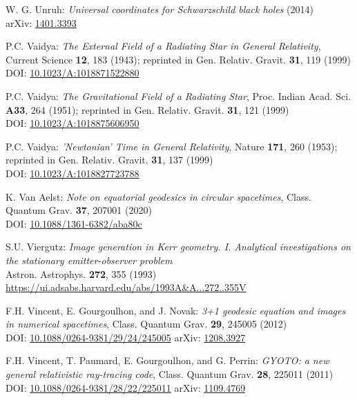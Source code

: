 \begin{thebibliography}{123}
W. G. Unruh: {\em Universal coordinates for Schwarzschild black holes} (2014)\\
arXiv: \href{https://arxiv.org/abs/1401.3393}{1401.3393}

P.C. Vaidya:
{\em The External Field of a Radiating Star in General Relativity},
Current Science {\bf 12}, 183 (1943);
reprinted in Gen. Relativ. Gravit. {\bf 31}, 119 (1999)\\
DOI: \href{https://doi.org/10.1023/A:1018871522880}{10.1023/A:1018871522880}

P.C. Vaidya:
{\em The Gravitational Field of a Radiating Star},
Proc. Indian Acad. Sci. {\bf A33}, 264 (1951);
reprinted in Gen. Relativ. Gravit. {\bf 31}, 121 (1999)\\
DOI: \href{https://doi.org/10.1023/A:1018875606950}{10.1023/A:1018875606950}

P.C. Vaidya:
{\em 'Newtonian' Time in General Relativity},
Nature {\bf 171}, 260 (1953);
reprinted in Gen. Relativ. Gravit. {\bf 31}, 137 (1999)\\
DOI: \href{https://doi.org/10.1023/A:1018827723788}{10.1023/A:1018827723788}

K. Van Aelst: {\em Note on equatorial geodesics in circular spacetimes},
Class. Quantum Grav. {\bf 37}, 207001 (2020)\\
DOI: \href{https://doi.org/10.1088/1361-6382/aba80c}{10.1088/1361-6382/aba80c}

S.U. Viergutz:
{\em Image generation in Kerr geometry. I. Analytical investigations on the stationary emitter-observer problem}\\
Astron. Astrophys. {\bf 272}, 355 (1993)\\
\url{https://ui.adsabs.harvard.edu/abs/1993A&A...272..355V}

F.H. Vincent, E. Gourgoulhon, and J. Novak:
{\em 3+1 geodesic equation and images in numerical spacetimes},
Class. Quantum Grav. {\bf 29}, 245005 (2012)\\
DOI: \href{https://doi.org/10.1088/0264-9381/29/24/245005}{10.1088/0264-9381/29/24/245005}\hfill
arXiv: \href{https://arxiv.org/abs/1208.3927}{1208.3927}

F.H. Vincent, T. Paumard, E. Gourgoulhon, and G. Perrin:
{\em GYOTO: a new general relativistic ray-tracing code},
Class. Quantum Grav. {\bf 28}, 225011 (2011)\\
DOI: \href{https://doi.org/10.1088/0264-9381/28/22/225011}{10.1088/0264-9381/28/22/225011}
\hfill
arXiv: \href{https://arxiv.org/abs/1109.4769}{1109.4769}


\end{thebibliography}
